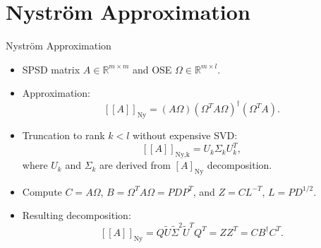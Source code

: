 \documentclass[aspectratio=169, xcolor=table]{beamer}
\begin{document}
\section{Nystr\"om Approximation}
\begin{frame}{Nystr\"om Approximation}
  \begin{itemize}
    \item SPSD matrix $A \in \mathbb{R}^{m \times m}$ and OSE $\Omega \in \mathbb{R}^{m \times l}$.
    \item Approximation:
      \[
       [\![A]\!]_{\text{Ny}} = (A\Omega)(\Omega^T A \Omega)^\dagger (\Omega^T A).
      \]
    \item Truncation to rank $k < l$ without expensive SVD:
      \[
        [\![A]\!]_{\text{Ny,k}} = U_k \Sigma_k U_k^T,
      \]
      where $U_k$ and $\Sigma_k$ are derived from $[A]_{\text{Ny}}$ decomposition.
    \item Compute $C = A \Omega$, $B = \Omega^T A \Omega = P D P^T$, and $Z = CL^{-T}$, $L=PD^{1/2} $.
    \item Resulting decomposition:
      \[
        [\![A]\!]_{\text{Ny}} = Q \tilde{U} \tilde{\Sigma}^2 \tilde{U}^T Q^T=ZZ^T=CB^\dagger C^T.
      \]
  \end{itemize}
\end{frame}
\end{document}
